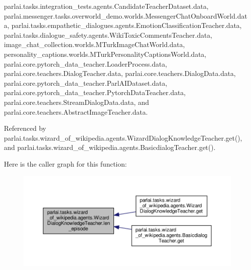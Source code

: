 parlai.\+tasks.\+integration\+\_\+tests.\+agents.\+Candidate\+Teacher\+Dataset.\+data, parlai.\+messenger.\+tasks.\+overworld\+\_\+demo.\+worlds.\+Messenger\+Chat\+Onboard\+World.\+data, parlai.\+tasks.\+empathetic\+\_\+dialogues.\+agents.\+Emotion\+Classification\+Teacher.\+data, parlai.\+tasks.\+dialogue\+\_\+safety.\+agents.\+Wiki\+Toxic\+Comments\+Teacher.\+data, image\+\_\+chat\+\_\+collection.\+worlds.\+M\+Turk\+Image\+Chat\+World.\+data, personality\+\_\+captions.\+worlds.\+M\+Turk\+Personality\+Captions\+World.\+data, parlai.\+core.\+pytorch\+\_\+data\+\_\+teacher.\+Loader\+Process.\+data, parlai.\+core.\+teachers.\+Dialog\+Teacher.\+data, parlai.\+core.\+teachers.\+Dialog\+Data.\+data, parlai.\+core.\+pytorch\+\_\+data\+\_\+teacher.\+Parl\+A\+I\+Dataset.\+data, parlai.\+core.\+pytorch\+\_\+data\+\_\+teacher.\+Pytorch\+Data\+Teacher.\+data, parlai.\+core.\+teachers.\+Stream\+Dialog\+Data.\+data, and parlai.\+core.\+teachers.\+Abstract\+Image\+Teacher.\+data.



Referenced by parlai.\+tasks.\+wizard\+\_\+of\+\_\+wikipedia.\+agents.\+Wizard\+Dialog\+Knowledge\+Teacher.\+get(), and parlai.\+tasks.\+wizard\+\_\+of\+\_\+wikipedia.\+agents.\+Basicdialog\+Teacher.\+get().

Here is the caller graph for this function\+:
\nopagebreak
\begin{figure}[H]
\begin{center}
\leavevmode
\includegraphics[width=350pt]{classparlai_1_1tasks_1_1wizard__of__wikipedia_1_1agents_1_1WizardDialogKnowledgeTeacher_adc1c3fa619c8bffd25986d41fb6f4136_icgraph}
\end{center}
\end{figure}
\mbox{\label{classparlai_1_1tasks_1_1wizard__of__wikipedia_1_1agents_1_1WizardDialogKnowledgeTeacher_ad196e2551898f2a9e8d24414631a87bf}} 
